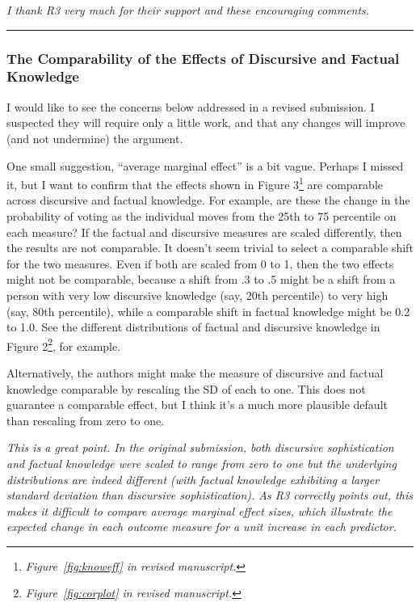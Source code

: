 \textit{I thank R3 very much for their support and these encouraging comments.}

\rule{\linewidth}{.01cm}


\subsubsection*{The Comparability of the Effects of Discursive and Factual Knowledge}

I would like to see the concerns below addressed in a revised submission. I suspected they will require only a little work, and that any changes will improve (and not undermine) the argument. 

One small suggestion, ``average marginal effect'' is a bit vague. Perhaps I missed it, but I want to confirm that the effects shown in Figure 3\footnote{\textit{Figure~\ref{fig:knoweff} in revised manuscript.}} are comparable across discursive and factual knowledge. For example, are these the change in the probability of voting as the individual moves from the 25th to 75 percentile on each measure? If the factual and discursive measures are scaled differently, then the results are not comparable. It doesn’t seem trivial to select a comparable shift for the two measures. Even if both are scaled from 0 to 1, then the two effects might not be comparable, because a shift from .3 to .5 might be a shift from a person with very low discursive knowledge (say, 20th percentile) to very high (say, 80th percentile), while a comparable shift in factual knowledge might be 0.2 to 1.0. See the different distributions of factual and discursive knowledge in Figure 2\footnote{\textit{Figure~\ref{fig:corplot} in revised manuscript.}}, for example.

Alternatively, the authors might make the measure of discursive and factual knowledge comparable by rescaling the SD of each to one. This does not guarantee a comparable effect, but I think it’s a much more plausible default than rescaling from zero to one.

\textit{This is a great point. In the original submission, both discursive sophistication and factual knowledge were scaled to range from zero to one but the underlying distributions are indeed different (with factual knowledge exhibiting a larger standard deviation than discursive sophistication). As R3 correctly points out, this makes it difficult to compare average marginal effect sizes, which illustrate the expected change in each outcome measure for a unit increase in each predictor.}

